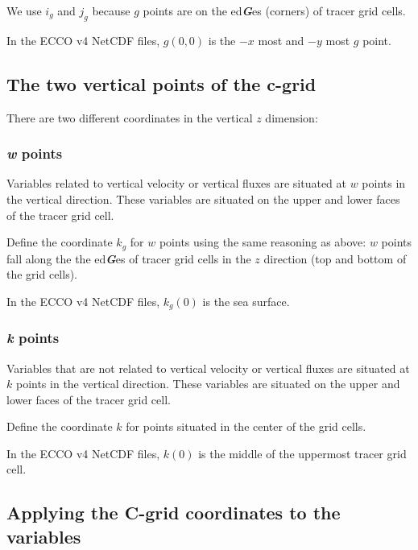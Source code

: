 \documentclass[11pt]{article}
\begin{document}
We use \(i_g\) and \(j_g\) because \(g\) points are on the
ed\textbf{\emph{G}}es (corners) of tracer grid cells.

In the ECCO v4 NetCDF files, \(g(0,0)\) is the \(-x\) most and \(-y\)
most \(g\) point.

\subsection{The two vertical points of the
c-grid}\label{the-two-vertical-points-of-the-c-grid}

There are two different coordinates in the vertical \(z\) dimension:

\subsubsection{\texorpdfstring{\emph{w}
points}{w points}}\label{w-points}

Variables related to vertical velocity or vertical fluxes are situated
at \(w\) points in the vertical direction. These variables are situated
on the upper and lower faces of the tracer grid cell.

Define the coordinate \(k_g\) for \(w\) points using the same reasoning
as above: \(w\) points fall along the the ed\textbf{\emph{G}}es of
tracer grid cells in the \(z\) direction (top and bottom of the grid
cells).

In the ECCO v4 NetCDF files, \(k_g(0)\) is the sea surface.

\subsubsection{\texorpdfstring{\emph{k}
points}{k points}}\label{k-points}

Variables that are not related to vertical velocity or vertical fluxes
are situated at \(k\) points in the vertical direction. These variables
are situated on the upper and lower faces of the tracer grid cell.

Define the coordinate \(k\) for points situated in the center of the
grid cells.

In the ECCO v4 NetCDF files, \(k(0)\) is the middle of the uppermost
tracer grid cell.

\subsection{Applying the C-grid coordinates to the
variables}\label{applying-the-c-grid-coordinates-to-the-variables}
\end{document}
